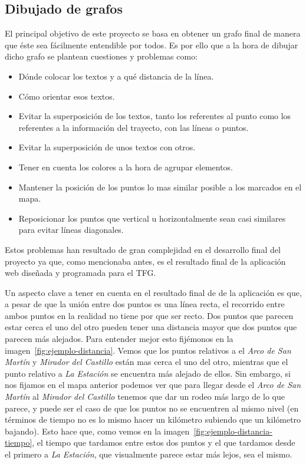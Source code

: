 


\subsection{Dibujado de grafos}\label{sub:dibujar-grafo-svg}
El principal objetivo de este proyecto se basa en obtener un grafo final de manera que éste sea fácilmente entendible por todos. Es por ello que a la hora de dibujar dicho grafo se plantean cuestiones y problemas como:
\begin{itemize}
	\item Dónde colocar los textos y a qué distancia de la línea.
	\item Cómo orientar esos textos.
	\item Evitar la superposición de los textos, tanto los referentes al punto como los referentes a la información del trayecto, con las líneas o puntos.
	\item Evitar la superposición de unos textos con otros.
	\item Tener en cuenta los colores a la hora de agrupar elementos.
	\item Mantener la posición de los puntos lo mas similar posible a los marcados en el mapa.
	\item Reposicionar los puntos que vertical u horizontalmente sean casi similares para evitar líneas diagonales.
\end{itemize}

Estos problemas han resultado de gran complejidad en el desarrollo final del proyecto ya que, como mencionaba antes, es el resultado final de la aplicación web diseñada y programada para el TFG.

Un aspecto clave a tener en cuenta en el resultado final de de la aplicación es que, a pesar de que la unión entre dos puntos es una línea recta, el recorrido entre ambos puntos en la realidad no tiene por que ser recto. Dos puntos que parecen estar cerca el uno del otro pueden tener una distancia mayor que dos puntos que parecen más alejados. Para entender mejor esto fijémonos en la imagen~\ref{fig:ejemplo-distancia}. Vemos que los puntos relativos a el \textit{Arco de San Martín} y \textit{Mirador del Castillo} están mas cerca el uno del otro, mientras que el punto relativo a \textit{La Estación} se encuentra más alejado de ellos.
Sin embargo, si nos fijamos en el mapa anterior podemos ver que para llegar desde el \textit{Arco de San Martín} al \textit{Mirador del Castillo} tenemos que dar un rodeo más largo de lo que parece, y puede ser el caso de que los puntos no se encuentren al mismo nivel (en términos de tiempo no es lo mismo hacer un kilómetro subiendo que un kilómetro bajando). Esto hace que, como vemos en la imagen~\ref{fig:ejemplo-distancia-tiempo}, el tiempo que tardamos entre estos dos puntos y el que tardamos desde el primero a \textit{La Estación}, que visualmente parece estar más lejos, sea el mismo.

